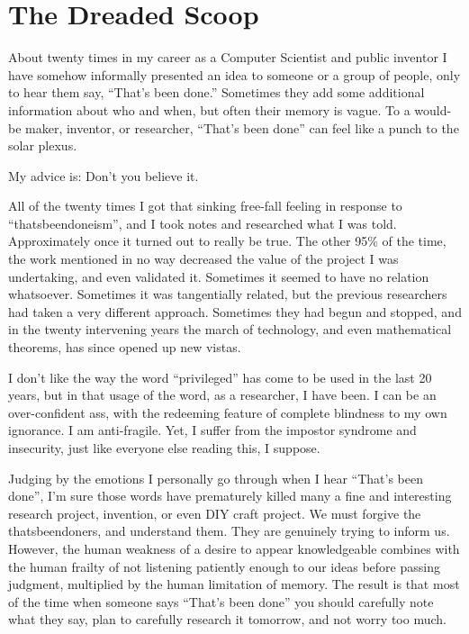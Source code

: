 \documentclass[
	fontsize=10pt, %
	twoside=false, %
	secnumdepth=1, %
]{kaobook}
\begin{document}
\section{The Dreaded Scoop}

About twenty times in my career as a Computer Scientist and public
inventor I have somehow informally presented an idea to someone or a
group of people, only to hear them say, “That’s been done.”  Sometimes
they add some additional information about who and when, but often
their memory is vague.  To a would-be maker, inventor, or researcher,
“That’s been done” can feel like a punch to the solar plexus.

My advice is: Don’t you believe it.

All of the twenty times I got that sinking free-fall feeling in
response to “thatsbeendoneism”, and I took notes and researched what I
was told. Approximately once it turned out to really be true.  The
other 95\% of the time, the work mentioned in no way decreased the
value of the project I was undertaking, and even validated
it. Sometimes it seemed to have no relation whatsoever. Sometimes it
was tangentially related, but the previous researchers had taken a
very different approach. Sometimes they had begun and stopped, and in
the twenty intervening years the march of technology, and even
mathematical theorems, has since opened up new vistas.

I don’t like the way the word “privileged” has come to be used in the
last 20 years, but in that usage of the word, as a researcher, I have
been. I can be an over-confident ass, with the redeeming feature of
complete blindness to my own ignorance. I am anti-fragile. Yet, I
suffer from the impostor syndrome and insecurity, just like everyone
else reading this, I suppose.

Judging by the emotions I personally go through when I hear “That’s
been done”, I’m sure those words have prematurely killed many a fine
and interesting research project, invention, or even DIY craft
project.  We must forgive the thatsbeendoners, and understand
them. They are genuinely trying to inform us. However, the human
weakness of a desire to appear knowledgeable combines with the human
frailty of not listening patiently enough to our ideas before passing
judgment, multiplied by the human limitation of memory. The result is
that most of the time when someone says “That’s been done” you should
carefully note what they say, plan to carefully research it tomorrow,
and not worry too much.
\end{document}
